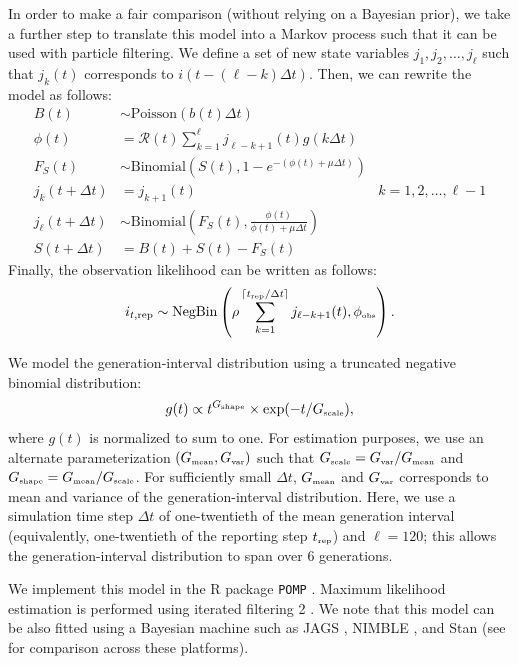 \documentclass{article}
\newcommand{\tsub}[2]{#1_{{\textrm{\tiny #2}}}}
\begin{document}
In order to make a fair comparison (without relying on a Bayesian prior), we take a further step to translate this model into a Markov process such that it can be used with particle filtering.
We define a set of new state variables $j_1, j_2, \dots, j_\ell$ such that $j_k(t)$ corresponds to $i(t- (\ell-k) \Delta t)$.
Then, we can rewrite the model as follows:
\begin{equation}
\begin{aligned}
B(t) &\sim \mathrm{Poisson}(b(t) \Delta t)\\
\phi(t) &= \mathcal R(t) \sum_{k=1}^\ell j_{\ell-k+1}(t) g(k \Delta t)\\
F_{S}(t) &\sim \mathrm{Binomial}\left(S(t), 1 - e^{-(\phi(t) + \mu \Delta t)} \right)\\
j_k(t+\Delta t) &= j_{k+1}(t) &k=1, 2, \dots, \ell-1\\
j_\ell(t + \Delta t) &\sim \mathrm{Binomial}\left(F_{S}(t), \frac{\phi(t)}{\phi(t) + \mu \Delta t} \right)\\
S(t + \Delta t) &= B(t) + S(t) - F_{S}(t)
\end{aligned}
\end{equation}
Finally, the observation likelihood can be written as follows:
\begin{equation}
i_{t, {\tiny \textrm{rep}}} \sim \mathrm{NegBin}\left(\rho \sum_{k=1}^{\lceil\tsub{t}{rep}/\Delta t\rceil} j_{\ell-k+1}(t) , \tsub{\phi}{obs}\right).
\end{equation}

We model the generation-interval distribution using a truncated negative binomial distribution:
\begin{equation}
g(t) \propto t^{\tsub{G}{shape}} \times \exp(-t/\tsub{G}{scale}),
\end{equation}
where $g(t)$ is normalized to sum to one.
For estimation purposes, we use an alternate parameterization $(\tsub{G}{mean}, \tsub{G}{var})$ such that $\tsub{G}{scale} = \tsub{G}{var}/\tsub{G}{mean}$ and $\tsub{G}{shape} = \tsub{G}{mean}/\tsub{G}{scale}$.
For sufficiently small $\Delta t$, $\tsub{G}{mean}$ and $\tsub{G}{var}$ corresponds to mean and variance of the generation-interval distribution.
Here, we use a simulation time step $\Delta t$ of one-twentieth of the mean generation interval (equivalently, one-twentieth of the reporting step $\tsub{t}{rep}$) and $\ell = 120$; this allows the generation-interval distribution to span over 6 generations.

We implement this model in the R package \texttt{POMP} \citep{king2015statistical}.
Maximum likelihood estimation is performed using iterated filtering 2 \citep{ionides2015inference}.
We note that this model can be also fitted using a Bayesian machine such as JAGS \citep{plummer2003jags}, NIMBLE \citep{de2017programming}, and Stan \citep{carpenter2017stan} (see \cite{li2018fitting} for comparison across these platforms).
\end{document}
